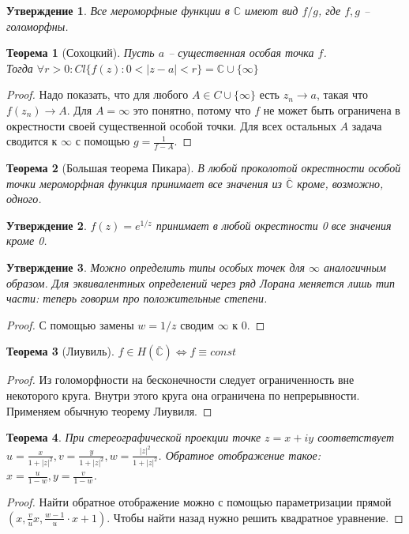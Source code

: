 \documentclass[12pt, letterpaper]{article}
\newtheorem{theorem}{Теорема}[section]
\newtheorem{prop}{Утверждение}[section]
\begin{document}
\begin{prop} Все мероморфные функции в $\mathbb{C}$ имеют вид $f/g$, где $f,g$ -- голоморфны.
\end{prop}

\begin{theorem}[Сохоцкий]
Пусть $a$ -- существенная особая точка $f$.\\ Тогда $\forall r > 0: Cl\{f(z) : 0 < |z-a| < r\} = \mathbb{C} \cup \{\infty \}$
\end{theorem}
\begin{proof} Надо показать, что для любого $A \in C \cup \{\infty \}$ есть $z_n \longrightarrow a$, такая что $f(z_n) \longrightarrow A$. Для $A=\infty$ это понятно, потому что $f$ не может быть ограничена в окрестности своей существенной особой точки. Для всех остальных $A$ задача сводится к $\infty$ с помощью $g = \frac1{f-A}$.
\end{proof}

\begin{theorem}[Большая теорема Пикара]
В любой проколотой окрестности особой точки мероморфная функция принимает все значения из $  \overline{\mathbb{C}}$ кроме, возможно, одного.
\end{theorem}

\begin{prop} $f(z) = e^{1/z}$ принимает в любой окрестности 0 все значения кроме 0.
\end{prop}

\begin{prop}
Можно определить типы особых точек для $\infty$ аналогичным образом. Для эквивалентных определений через ряд Лорана меняется лишь тип части: теперь говорим про положительные степени.
\end{prop}
\begin{proof}
С помощью замены $w=1/z$ сводим $\infty$ к 0.
\end{proof}

\begin{theorem}[Лиувиль]
$f \in H(\overline{\mathbb{C}}) \Leftrightarrow f \equiv const$ 
\end{theorem}

\begin{proof}
Из голоморфности на бесконечности следует ограниченность вне некоторого круга. Внутри этого круга она ограничена по непрерывности. Применяем обычную теорему Лиувиля.
\end{proof}

\begin{theorem}
При стереографической проекции точке $z=x+iy$ соответствует $u=\frac{x}{1+|z|^2}, v = \frac{y}{1+|z|^2}, w=\frac{|z|^2}{1+|z|^2}$. Обратное отображение такое: $x=\frac{u}{1-w}, y=\frac{v}{1-w}$.
\end{theorem}
\begin{proof}
Найти обратное отображение можно с помощью параметризации прямой $(x, \frac{v}{u} x, \frac{w-1}{u} \cdot x +1)$. Чтобы найти назад нужно решить квадратное уравнение. 
\end{proof}
\end{document}
